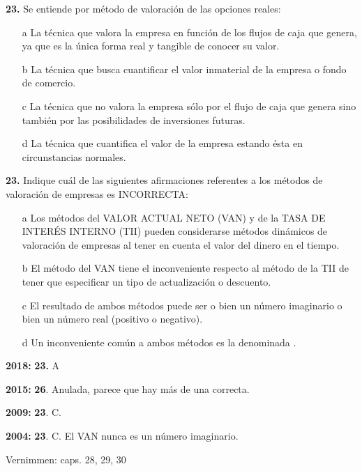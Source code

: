 \documentclass{nuevotema}
\begin{document}
\textbf{23.} Se entiende por método de valoración de las opciones reales:

\begin{enumerate}
    \item[a] La técnica que valora la empresa en función de los flujos de caja que genera, ya que es la única forma real y tangible de conocer su valor.
    \item[b] La técnica que busca cuantificar el valor inmaterial de la empresa o fondo de comercio.
    \item[c] La técnica que no valora la empresa sólo por el flujo de caja que genera sino también por las posibilidades de inversiones futuras.
    \item[d] La técnica que cuantifica el valor de la empresa estando ésta en circunstancias normales.
\end{enumerate}


\textbf{23.} Indique cuál de las siguientes afirmaciones referentes a los métodos de valoración de empresas es INCORRECTA:

\begin{enumerate}
    \item[a] Los métodos del VALOR ACTUAL NETO (VAN) y de la TASA DE INTERÉS INTERNO (TII) pueden considerarse métodos dinámicos de valoración de empresas al tener en cuenta el valor del dinero en el tiempo.
    \item[b] El método del VAN tiene el inconveniente respecto al método de la TII de tener que especificar un tipo de actualización o descuento.
    \item[c] El resultado de ambos métodos puede ser o bien un número imaginario o bien un número real (positivo o negativo).
    \item[d] Un inconveniente común a ambos métodos es la denominada .
\end{enumerate}

\notas

\textbf{2018:} \textbf{23.} A

\textbf{2015:} \textbf{26}. Anulada, parece que hay más de una correcta.

\textbf{2009:} \textbf{23}. C.

\textbf{2004:} \textbf{23}. C. El VAN nunca es un número imaginario.


\bibliografia

Vernimmen: caps. 28, 29, 30
\end{document}
